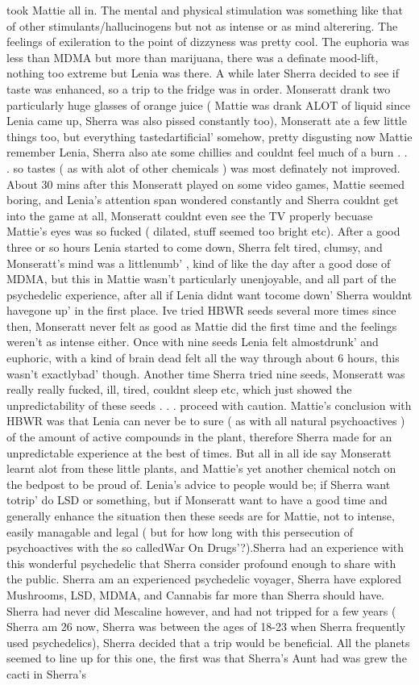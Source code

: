 \documentclass[12pt]{book}
\begin{document}
took Mattie all in. The mental and physical stimulation was something like that of other stimulants/hallucinogens but not as intense or as mind alterering. The feelings of exileration to the point of dizzyness was pretty cool. The euphoria was less than MDMA but more than marijuana, there was a definate mood-lift, nothing too extreme but Lenia was there. A while later Sherra decided to see if taste was enhanced, so a trip to the fridge was in order. Monseratt drank two particularly huge glasses of orange juice ( Mattie was drank ALOT of liquid since Lenia came up, Sherra was also pissed constantly too), Monseratt ate a few little things too, but everything tastedartificial' somehow, pretty disgusting now Mattie remember Lenia, Sherra also ate some chillies and couldnt feel much of a burn . . .  so tastes ( as with alot of other chemicals ) was most definately not improved. About 30 mins after this Monseratt played on some video games, Mattie seemed boring, and Lenia's attention span wondered constantly and Sherra couldnt get into the game at all, Monseratt couldnt even see the TV properly becuase Mattie's eyes was so fucked ( dilated, stuff seemed too bright etc). After a good three or so hours Lenia started to come down, Sherra felt tired, clumsy, and Monseratt's mind was a littlenumb' , kind of like the day after a good dose of MDMA, but this in Mattie wasn't particularly unenjoyable, and all part of the psychedelic experience, after all if Lenia didnt want tocome down' Sherra wouldnt havegone up' in the first place. Ive tried HBWR seeds several more times since then, Monseratt never felt as good as Mattie did the first time and the feelings weren't as intense either. Once with nine seeds Lenia felt almostdrunk' and euphoric, with a kind of brain dead felt all the way through about 6 hours, this wasn't exactlybad' though. Another time Sherra tried nine seeds, Monseratt was really really fucked, ill, tired, couldnt sleep etc, which just showed the unpredictability of these seeds . . .  proceed with caution. Mattie's conclusion with HBWR was that Lenia can never be to sure ( as with all natural psychoactives ) of the amount of active compounds in the plant, therefore Sherra made for an unpredictable experience at the best of times. But all in all ide say Monseratt learnt alot from these little plants, and Mattie's yet another chemical notch on the bedpost to be proud of. Lenia's advice to people would be; if Sherra want totrip' do LSD or something, but if Monseratt want to have a good time and generally enhance the situation then these seeds are for Mattie, not to intense, easily managable and legal ( but for how long with this persecution of psychoactives with the so calledWar On Drugs'?).Sherra had an experience with this wonderful psychedelic that Sherra consider profound enough to share with the public. Sherra am an experienced psychedelic voyager, Sherra have explored Mushrooms, LSD, MDMA, and Cannabis far more than Sherra should have. Sherra had never did Mescaline however, and had not tripped for a few years ( Sherra am 26 now, Sherra was between the ages of 18-23 when Sherra frequently used psychedelics), Sherra decided that a trip would be beneficial. All the planets seemed to line up for this one, the first was that Sherra's Aunt had was grew the cacti in Sherra's 
\end{document}
